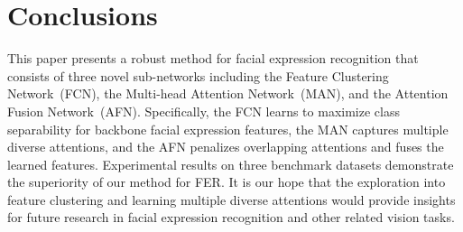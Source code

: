 \documentclass{article}
\begin{document}
\section{Conclusions}
\label{sec:conclusion}
This paper presents a robust method for facial expression recognition that consists of three novel sub-networks including the Feature Clustering Network~(FCN), the Multi-head Attention Network~(MAN), and the Attention Fusion Network~(AFN). Specifically, the FCN learns to maximize class separability for backbone facial expression features, the MAN captures multiple diverse attentions, and the AFN penalizes overlapping attentions and fuses the learned features.
Experimental results on three benchmark datasets demonstrate the superiority of our method for FER. 
It is our hope that the exploration into feature clustering and learning multiple diverse attentions would provide insights for future research in facial expression recognition and other related vision tasks.

  
  
\end{document}
